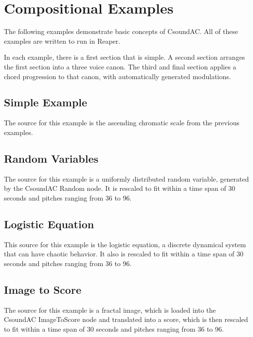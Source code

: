 \documentclass[letterpaper,10pt,DIV=12]{scrartcl}
\begin{document}
\section{Compositional Examples}

The following examples demonstrate basic concepts of CsoundAC.  All of these examples are written to run in Reaper.

In each example, there is a first section that is simple. A second section arranges the first section into a three voice canon. The third and final section applies a chord progression to that canon, with automatically generated modulations.

\subsection{Simple Example}

The source for this example is the ascending chromatic scale from the previous examples.

\subsection{Random Variables}

The source for this example is a uniformly distributed random variable, generated by the CsoundAC Random node. It is rescaled to fit within a time span of 30 seconds and pitches ranging from 36 to 96.

\subsection{Logistic Equation}

This source for this example is the logistic equation, a discrete dynamical system that can have chaotic behavior. It also is rescaled to fit within a time span of 30 seconds and pitches ranging from 36 to 96.

\subsection{Image to Score}

The source for this example is a fractal image, which is loaded into the CsoundAC ImageToScore node and translated into a score, which is then rescaled to fit within a time span of 30 seconds and pitches ranging from 36 to 96.
\end{document}
